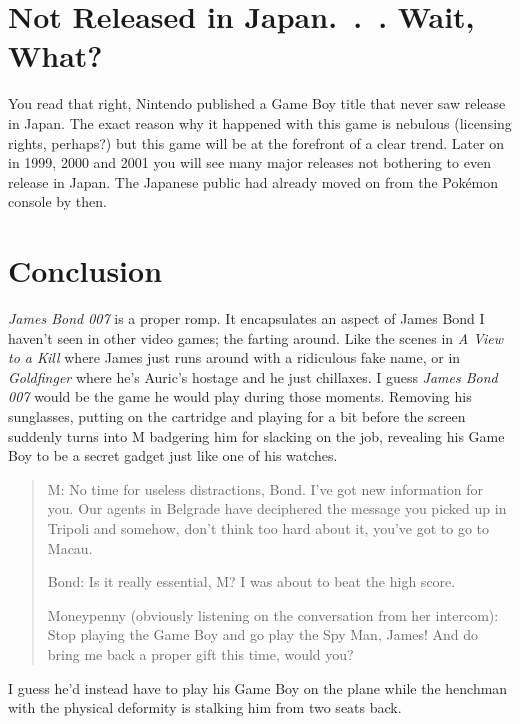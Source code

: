 \documentclass{book}
\begin{document}
\FloatBarrier\needspace{10mm}\section*{Not Released in Japan. . . Wait, What?}\nopagebreak[4]

You read that right, Nintendo published a Game Boy title that never saw release in Japan. The exact reason why it happened with this game is nebulous (licensing rights, perhaps?) but this game will be at the forefront of a clear trend. Later on in 1999, 2000 and 2001 you will see many major releases not bothering to even release in Japan. The Japanese public had already moved on from the Pokémon console by then.

\FloatBarrier\needspace{10mm}\section*{Conclusion}\nopagebreak[4]

\emph{James Bond 007} is a proper romp. It encapsulates an aspect of James Bond I haven’t seen in other video games; the farting around. Like the scenes in \emph{A View to a Kill} where James just runs around with a ridiculous fake name, or in \emph{Goldfinger} where he’s Auric’s hostage and he just chillaxes. I guess \emph{James Bond 007} would be the game he would play during those moments. Removing his sunglasses, putting on the cartridge and playing for a bit before the screen suddenly turns into M badgering him for slacking on the job, revealing his Game Boy to be a secret gadget just like one of his watches.

\begin{quote}
M: No time for useless distractions, Bond. I’ve got new information for you. Our agents in Belgrade have deciphered the message you picked up in Tripoli and somehow, don’t think too hard about it, you’ve got to go to Macau.

Bond: Is it really essential, M? I was about to beat the high score.

Moneypenny (obviously listening on the conversation from her intercom): Stop playing the Game Boy and go play the Spy Man, James! And do bring me back a proper gift this time, would you?
\end{quote} \par

I guess he’d instead have to play his Game Boy on the plane while the henchman with the physical deformity is stalking him from two seats back.
\end{document}
